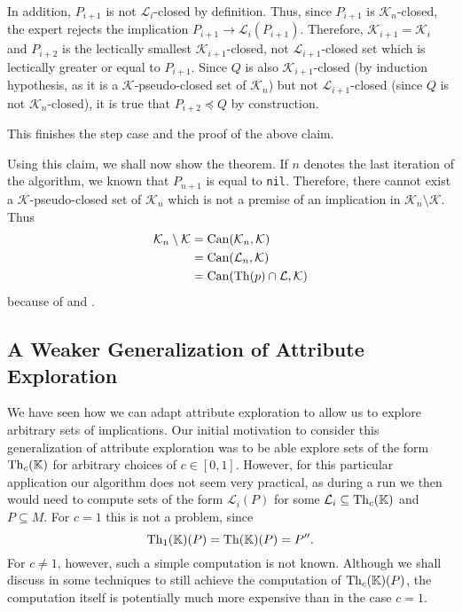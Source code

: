\begin{Proof}
  In addition, $P_{i+1}$ is not $\mathcal{L}_{i}$-closed by definition.  Thus, since
  $P_{i+1}$ is $\mathcal{K}_{n}$-closed, the expert rejects the implication $P_{i+1} \to
  \mathcal{L}_{i}(P_{i+1})$.  Therefore, $\mathcal{K}_{i+1} = \mathcal{K}_{i}$ and
  $P_{i+2}$ is the lectically smallest $\mathcal{K}_{i+1}$-closed, not
  $\mathcal{L}_{i+1}$-closed set which is lectically greater or equal to $P_{i+1}$.  Since
  $Q$ is also $\mathcal{K}_{i+1}$-closed (by induction hypothesis, as it is a
  $\mathcal{K}$-pseudo-closed set of $\mathcal{K}_{n}$) but not $\mathcal{L}_{i+1}$-closed
  (since $Q$ is not $\mathcal{K}_{n}$-closed), it is true that $P_{i+2} \preceq Q$ by
  construction.

  This finishes the step case and the proof of the above claim.

  Using this claim, we shall now show the theorem.  If $n$ denotes the last iteration of
  the algorithm, we known that $P_{n+1}$ is equal to \lstinline{nil}.  Therefore, there
  cannot exist a $\mathcal{K}$-pseudo-closed set of $\mathcal{K}_{n}$ which is not a
  premise of an implication in $\mathcal{K}_{n} \setminus \mathcal{K}$.  Thus
  \begin{align*}
    \mathcal{K}_{n} \setminus \mathcal{K}
    &= \operatorname{Can}(\mathcal{K}_{n}, \mathcal{K}) \\
    &= \operatorname{Can}(\mathcal{L}_{n}, \mathcal{K}) \\
    &= \operatorname{Can}(\operatorname{Th}(p) \cap \mathcal{L}, \mathcal{K})
  \end{align*}
  because of  and
  .  
\end{Proof}

\subsection{A Weaker Generalization of Attribute Exploration}
\label{sec:weak-gener-attr}

We have seen how we can adapt attribute exploration to allow us to explore arbitrary sets
of implications.  Our initial motivation to consider this generalization of attribute
exploration was to be able explore sets of the form $\operatorname{Th}_{c}({\mathbb{K}})$ for arbitrary
choices of $c \in [0,1]$.  However, for this particular application our algorithm does not
seem very practical, as during a run we then would need to compute sets of the form
$\mathcal{L}_{i}(P)$ for some $\mathcal{L}_{i} \subseteq \operatorname{Th}_{c}({\mathbb{K}})$ and $P \subseteq
M$.  For $c = 1$ this is not a problem, since
\begin{equation*}
  \operatorname{Th}_{1}({\mathbb{K}})(P) = \operatorname{Th}({\mathbb{K}})(P) = P''.
\end{equation*}
For $c \neq 1$, however, such a simple computation is not known.  Although we shall
discuss in  some techniques to still achieve the computation of
$\operatorname{Th}_{c}({\mathbb{K}})(P)$, the computation itself is potentially much more expensive than in
the case $c = 1$.

